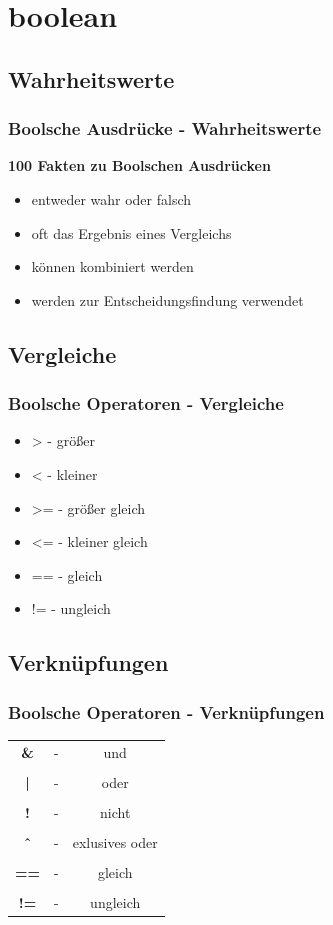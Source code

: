 \documentclass[final]{beamer}
\begin{document}
\section{boolean}
\subsection{Wahrheitswerte}
\begin{frame}
	\frametitle{Boolsche Ausdrücke - Wahrheitswerte}
	\textbf{100 Fakten zu Boolschen Ausdrücken}
	\begin{itemize}
		\item{entweder wahr oder falsch}
		\item{oft das Ergebnis eines Vergleichs}
		\item{können kombiniert werden}
		\item{werden zur Entscheidungsfindung verwendet}
	\end{itemize}
\end{frame}


\subsection{Vergleiche}
\begin{frame}
	\frametitle{Boolsche Operatoren - Vergleiche}
	\begin{itemize}
		\item{>  - größer}
		\item{<  - kleiner}
		\item{>= - größer gleich}
		\item{<= - kleiner gleich}
		\item{== - gleich}
		\item{!= - ungleich}
	\end{itemize}
\end{frame}

\subsection{Verknüpfungen}
\begin{frame}
	\frametitle{Boolsche Operatoren - Verknüpfungen}
	\begin{tabular}{c c c}
		\textbf{\&}  & - & und \\&&\\
		\textbf{|} & - & oder \\&&\\
		\textbf{!} & - & nicht \\&&\\
		\textbf{\^\ }  & - &  exlusives oder \\&&\\
		\textbf{==} & - & gleich \\&&\\
		\textbf{!=} & - & ungleich \\
	\end{tabular}
	\
\end{frame}
\end{document}
